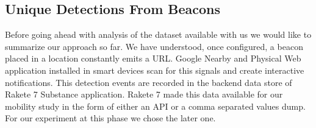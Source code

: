 \subsection{Unique Detections From Beacons}

Before going ahead with analysis of the dataset available with us we would like to summarize our approach so far. We have understood, once configured, a beacon placed in a location constantly emits a URL. Google Nearby and Physical Web application installed in smart devices scan for this signals and create interactive notifications. This detection events are recorded in the backend data store of Rakete 7 Substance\cite{Rakete7Substance} application. Rakete 7 made this data available for our mobility study in the form of either an API or a comma separated values dump. For our experiment at this phase we chose the later one.


